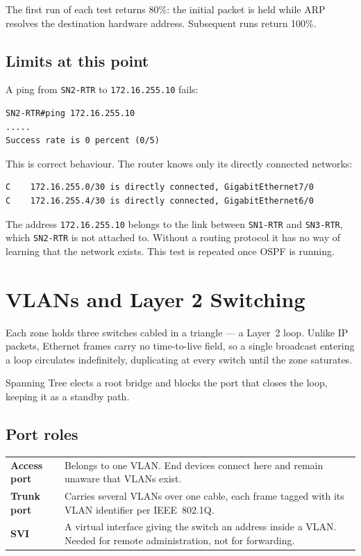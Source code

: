 \documentclass[12pt,a4paper]{article}
\begin{document}
The first run of each test returns 80\%: the initial packet is held while ARP
resolves the destination hardware address. Subsequent runs return 100\%.

\subsection{Limits at this point}

A ping from \texttt{SN2-RTR} to \texttt{172.16.255.10} fails:

\begin{lstlisting}
SN2-RTR#ping 172.16.255.10
.....
Success rate is 0 percent (0/5)
\end{lstlisting}

This is correct behaviour. The router knows only its directly connected networks:

\begin{lstlisting}
C    172.16.255.0/30 is directly connected, GigabitEthernet7/0
C    172.16.255.4/30 is directly connected, GigabitEthernet6/0
\end{lstlisting}

The address \texttt{172.16.255.10} belongs to the link between \texttt{SN1-RTR}
and \texttt{SN3-RTR}, which \texttt{SN2-RTR} is not attached to. Without a
routing protocol it has no way of learning that the network exists. This test is
repeated once OSPF is running.

\newpage
\section{VLANs and Layer 2 Switching}

Each zone holds three switches cabled in a triangle --- a Layer~2 loop. Unlike IP
packets, Ethernet frames carry no time-to-live field, so a single broadcast
entering a loop circulates indefinitely, duplicating at every switch until the
zone saturates.

Spanning Tree elects a root bridge and blocks the port that closes the loop,
keeping it as a standby path.

\subsection{Port roles}

\begin{table}[H]
\centering
\begin{tabular}{@{} l p{9cm} @{}}
\toprule
\textbf{Access port} & Belongs to one VLAN. End devices connect here and remain
  unaware that VLANs exist. \\
\textbf{Trunk port} & Carries several VLANs over one cable, each frame tagged
  with its VLAN identifier per IEEE~802.1Q. \\
\textbf{SVI} & A virtual interface giving the switch an address inside a VLAN.
  Needed for remote administration, not for forwarding. \\
\bottomrule
\end{tabular}
\end{table}
\end{document}
